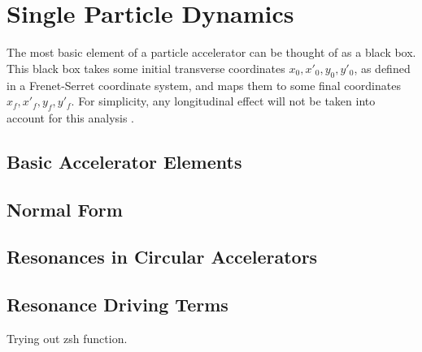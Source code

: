 \chapter{Single Particle Dynamics}
The most basic element of a particle accelerator can be thought of as a black box. This black box takes some initial transverse coordinates $x_0,x'_0,y_0,y'_0$, as defined in a Frenet-Serret coordinate system, and maps them to some final coordinates $x_f,x'_f,y_f,y'_f$. For simplicity, any longitudinal effect will not be taken into account for this analysis \cite{rr1} \cite{rr2} \cite{wolski} \cite{pipII1}. 

\section{Basic Accelerator Elements}

\section{Normal Form}

\section{Resonances in Circular Accelerators}

\section{Resonance Driving Terms}

Trying out zsh function.
